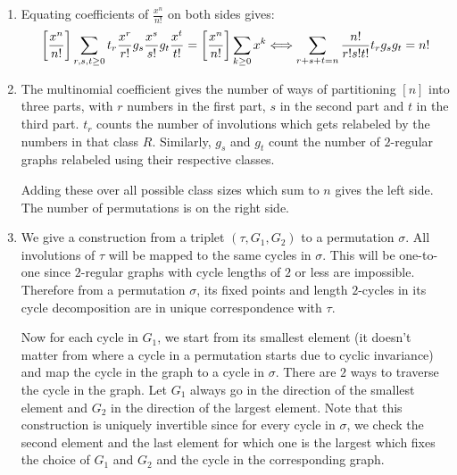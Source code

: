 \begin{solution}
    \begin{enumerate}[label=(\alph*)]
        \item Equating coefficients of $\frac{x^n}{n!}$ on both sides gives:
        \[
            \left[\frac{x^n}{n!}\right]\sum_{r,s,t \geq 0} t_r \frac{x^r}{r!} g_s \frac{x^s}{s!} g_t\frac{x^t}{t!} = \left[\frac{x^n}{n!}\right] \sum_{k\geq 0} x^k \Longleftrightarrow \sum_{r+s+t=n} \frac{n!}{r!s!t!}t_rg_sg_t = n!
        \]
        \item The multinomial coefficient gives the number of ways of partitioning $[n]$ into three parts, with $r$ numbers in the first part, $s$ in the second part and $t$ in the third part. $t_r$ counts the number of involutions which gets relabeled by the numbers in that class $R$. Similarly, $g_s$ and $g_t$ count the number of $2$-regular graphs relabeled using their respective classes.
        
        Adding these over all possible class sizes which sum to $n$ gives the left side. The number of permutations is on the right side.
        \item We give a construction from a triplet $(\tau, G_1, G_2)$ to a permutation $\sigma$. All involutions of $\tau$ will be mapped to the same cycles in $\sigma$. This will be one-to-one since $2$-regular graphs with cycle lengths of $2$ or less are impossible. Therefore from a permutation $\sigma$, its fixed points and length $2$-cycles in its cycle decomposition are in unique correspondence with $\tau$.
        
        Now for each cycle in $G_1$, we start from its smallest element (it doesn't matter from where a cycle in a permutation starts due to cyclic invariance) and map the cycle in the graph to a cycle in $\sigma$. There are $2$ ways to traverse the cycle in the graph. Let $G_1$ always go in the direction of the smallest element and $G_2$ in the direction of the largest element. Note that this construction is uniquely invertible since for every cycle in $\sigma$, we check the second element and the last element for which one is the largest which fixes the choice of $G_1$ and $G_2$ and the cycle in the corresponding graph.
    \end{enumerate}
\end{solution}

